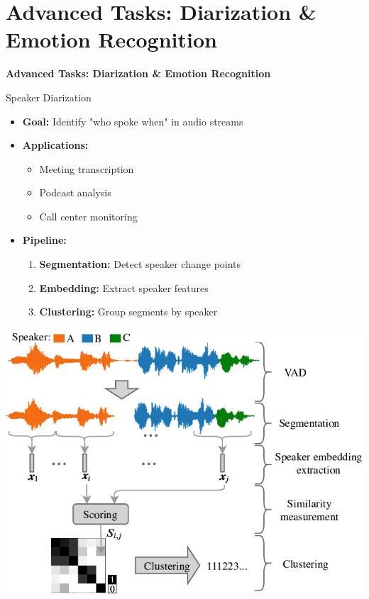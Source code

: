 \section{Advanced Tasks: Diarization \& Emotion Recognition}

\begin{frame}{}
    \LARGE \textbf{Advanced Tasks: Diarization \& Emotion Recognition}
\end{frame}

\begin{frame}[allowframebreaks]{Speaker Diarization}
    \begin{itemize}
        \item \textbf{Goal:} Identify "who spoke when" in audio streams
        \item \textbf{Applications:}
            \begin{itemize}
                \item Meeting transcription
                \item Podcast analysis
                \item Call center monitoring
            \end{itemize}
        \item \textbf{Pipeline:}
            \begin{enumerate}
                \item \textbf{Segmentation:} Detect speaker change points
                \item \textbf{Embedding:} Extract speaker features
                \item \textbf{Clustering:} Group segments by speaker
            \end{enumerate}
    \end{itemize}
    \begin{center}
        \includegraphics[width=\textwidth,height=0.9\textheight,keepaspectratio]{images/audio-nlp/diarization_pipeline.png}
    \end{center}
\end{frame}

